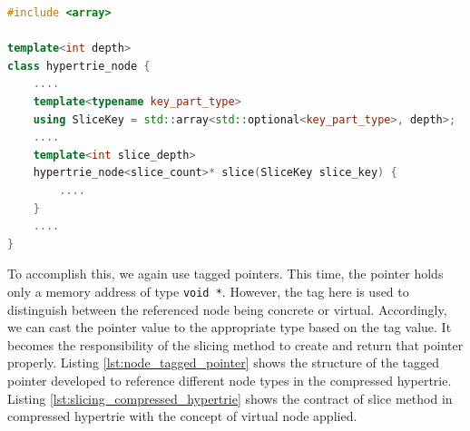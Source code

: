 \begin{lstlisting}[caption={Slicing method signituar defined for node where d = $depth$ in original Hypertrie},label={lst:slicing_original_hypertrie},language=C++]
#include <array>

template<int depth>
class hypertrie_node {
	....
	template<typename key_part_type>
	using SliceKey = std::array<std::optional<key_part_type>, depth>;
	....
	template<int slice_depth>
	hypertrie_node<slice_count>* slice(SliceKey slice_key) {
		....
	}
	....
}
\end{lstlisting} 

To accomplish this, we again use tagged pointers. This time, the pointer holds only a memory address of type \verb|void *|. However, the tag here is used to distinguish between the referenced node being concrete or virtual. Accordingly, we can cast the pointer value to the appropriate type based on the tag value. 
It becomes the responsibility of the slicing method to create and return that pointer properly. Listing \ref{lst:node_tagged_pointer} shows the structure of the tagged pointer developed to reference different node types in the compressed hypertrie. Listing \ref{lst:slicing_compressed_hypertrie} shows the contract of slice method in compressed hypertrie with the concept of virtual node applied.

